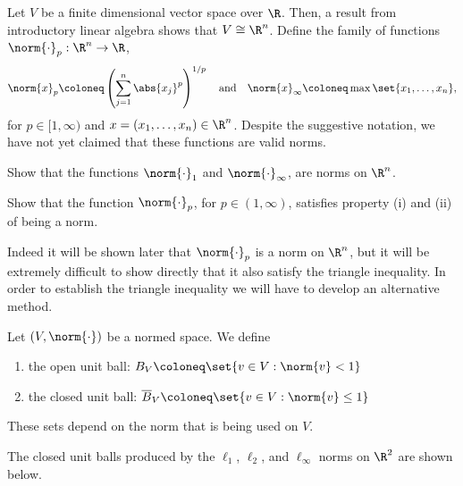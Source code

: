 \documentclass[draft]{penrose}
\newcommand{\oB}{B}
\newcommand{\cB}{\overline{B}}
\begin{document}
Let $V$ be a finite dimensional vector space over $\R$. Then, a result from introductory linear algebra shows that $V \cong \R^n$. Define the family of functions $\norm{\cdot}_{p}:\R^n \to \R$,
\begin{equation*}
  \norm{x}_{p} \coloneq \left(\sum_{j=1}^{n} \abs{x_j}^{p}\right)^{1/p}
  \quad\text{and}\quad
  \norm{x}_{\infty} \coloneq \max \set{x_1, \dots, x_n},
\end{equation*}
for $p \in [1,\infty)$ and $x = (x_1, \dots, x_n) \in \R^n$. Despite the suggestive notation, we have not yet claimed that these functions are valid norms.

\begin{nex}
  Show that the functions $\norm{\cdot}_{1}$ and $\norm{\cdot}_{\infty}$, are norms on $\R^n$.
\end{nex}

\begin{nex}
  Show that the function $\norm{\cdot}_{p}$, for $p \in (1,\infty)$, satisfies property (i) and (ii) of being a norm.
\end{nex}

\begin{remark}
  Indeed it will be shown later that $\norm{\cdot}_{p}$ is a norm on $\R^n$, but it will be extremely difficult to show directly that it also satisfy the triangle inequality. In order to establish the triangle inequality we will have to develop an alternative method.
\end{remark}

\begin{ndfn}
  Let $(V, \norm{\cdot})$ be a normed space. We define
  \begin{enumerate}
  \item the open unit ball: $\oB_{V} \coloneq \set{v \in V : \norm{v} < 1}$
  \item the closed unit ball: $\cB_{V} \coloneq \set{v \in V : \norm{v} \leq 1}$
  \end{enumerate}
\end{ndfn}
These sets depend on the norm that is being used on $V$.

The closed unit balls produced by the $\ell_{1}$, $\ell_{2}$, and $\ell_{\infty}$ norms on $\R^2$ are shown below.
\begin{center}
\end{center}
\end{document}
